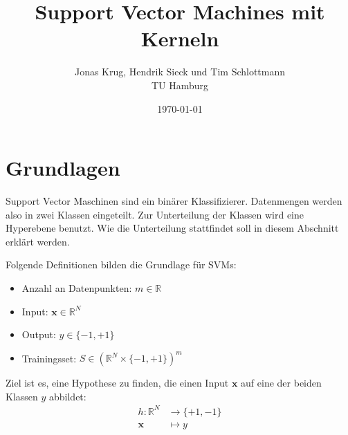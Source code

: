 \documentclass[10pt,a4paper]{scrartcl}
\title{Support Vector Machines mit Kerneln}
\author{Jonas Krug, Hendrik Sieck und Tim Schlottmann \\ TU Hamburg}
\date{\today}
\begin{document}
    \maketitle


        \section{Grundlagen}
            Support Vector Maschinen sind ein binärer Klassifizierer. Datenmengen werden also in zwei Klassen eingeteilt. Zur Unterteilung der Klassen wird eine Hyperebene benutzt. Wie die Unterteilung stattfindet soll in diesem Abschnitt erklärt werden.

            Folgende Definitionen bilden die Grundlage für SVMs:

            \begin{itemize}
                \item Anzahl an Datenpunkten: $ m \in \mathbb{R} $
                \item Input: $ \boldsymbol{x} \in \mathbb{R}^N $
                \item Output: $ y \in \{ -1, +1 \} $
                \item Trainingsset: $S \in (\mathbb{R}^N \times \{ -1, +1 \})^m $
            \end{itemize}

            Ziel ist es, eine Hypothese zu finden, die einen Input $\boldsymbol{x}$ auf eine der beiden Klassen $y$ abbildet: \begin{align*}
                h: \mathbb{R}^N &\to \{ +1, -1 \} \\
                \boldsymbol{x} &\mapsto y
            \end{align*}
\end{document}

